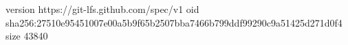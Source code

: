version https://git-lfs.github.com/spec/v1
oid sha256:27510e95451007e00a5b9f65b2507bba7466b799ddf99290c9a51425d271d0f4
size 43840

